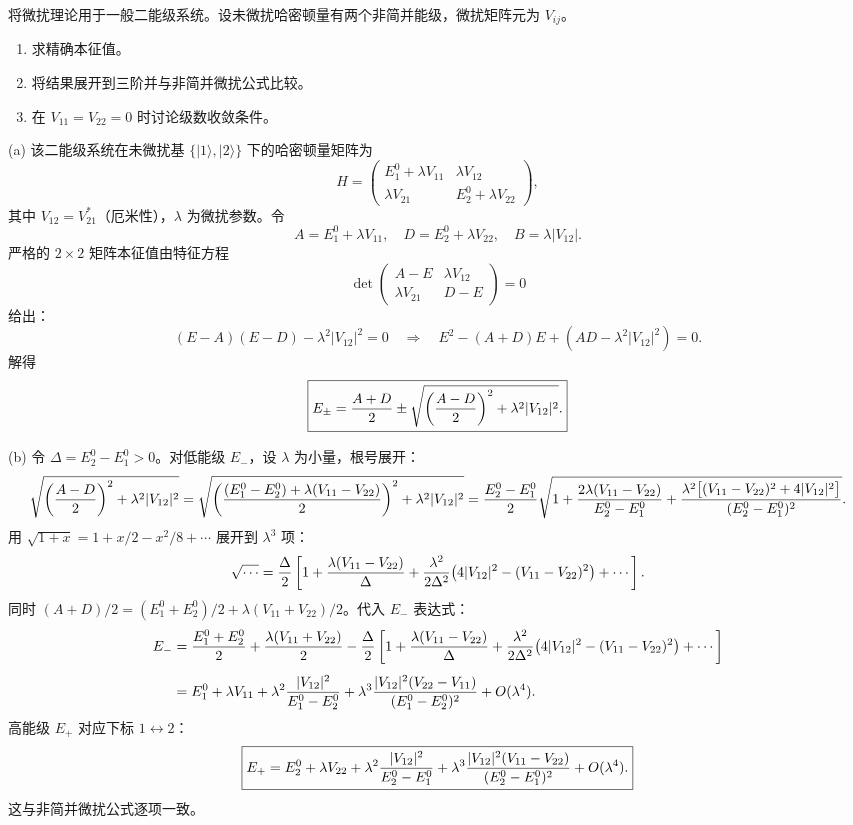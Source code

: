 \begin{question}
将微扰理论用于一般二能级系统。设未微扰哈密顿量有两个非简并能级，微扰矩阵元为 $V_{ij}$。
\begin{enumerate}
\item 求精确本征值。
\item 将结果展开到三阶并与非简并微扰公式比较。
\item 在 $V_{11}=V_{22}=0$ 时讨论级数收敛条件。
\end{enumerate}
\end{question}
\begin{solution}
(a) 该二能级系统在未微扰基 $\{|1\rangle,|2\rangle\}$ 下的哈密顿量矩阵为
\[
H=\begin{pmatrix}
E_1^0+\lambda V_{11} & \lambda V_{12}\\[2pt]
\lambda V_{21} & E_2^0+\lambda V_{22}
\end{pmatrix},
\]
其中 $V_{12}=V_{21}^*$（厄米性），$\lambda$ 为微扰参数。令
\[
A=E_1^0+\lambda V_{11},\quad D=E_2^0+\lambda V_{22},\quad
B=\lambda|V_{12}|.
\]
严格的 $2\times2$ 矩阵本征值由特征方程
\[
\det\begin{pmatrix}A-E & \lambda V_{12}\\ \lambda V_{21} & D-E\end{pmatrix}=0
\]
给出：
\[
(E-A)(E-D)-\lambda^2|V_{12}|^2=0
\quad\Longrightarrow\quad
E^2-(A+D)E+(AD-\lambda^2|V_{12}|^2)=0.
\]
解得
\[
\boxed{E_\pm={A+D\over2}\pm\sqrt{\left({A-D\over2}\right)^2+\lambda^2|V_{12}|^2}.}
\]

(b) 令 $\Delta=E_2^0-E_1^0>0$。对低能级 $E_-$，设 $\lambda$ 为小量，根号展开：
\[
\sqrt{\left({A-D\over2}\right)^2+\lambda^2|V_{12}|^2}
=\sqrt{\left({(E_1^0-E_2^0)+\lambda(V_{11}-V_{22})\over2}\right)^2+\lambda^2|V_{12}|^2}
={E_2^0-E_1^0\over2}\sqrt{1+{2\lambda(V_{11}-V_{22})\over E_2^0-E_1^0}
+{\lambda^2\bigl[(V_{11}-V_{22})^2+4|V_{12}|^2\bigr]\over (E_2^0-E_1^0)^2}}.
\]
用 $\sqrt{1+x}=1+x/2-x^2/8+\cdots$ 展开到 $\lambda^3$ 项：
\[
\sqrt{\cdots}={\Delta\over2}\left[1+
{\lambda(V_{11}-V_{22})\over\Delta}+
{\lambda^2\over2\Delta^2}\bigl(4|V_{12}|^2-(V_{11}-V_{22})^2\bigr)+\cdots\right].
\]
同时 $(A+D)/2=(E_1^0+E_2^0)/2+\lambda(V_{11}+V_{22})/2$。代入 $E_-$ 表达式：
\[
\begin{aligned}
E_-&={E_1^0+E_2^0\over2}+{\lambda(V_{11}+V_{22})\over2}
-{\Delta\over2}\left[1+{\lambda(V_{11}-V_{22})\over\Delta}
+{\lambda^2\over2\Delta^2}\bigl(4|V_{12}|^2-(V_{11}-V_{22})^2\bigr)+\cdots\right] \\[4pt]
&=E_1^0+\lambda V_{11}
+\lambda^2{|V_{12}|^2\over E_1^0-E_2^0}
+\lambda^3{|V_{12}|^2(V_{22}-V_{11})\over (E_1^0-E_2^0)^2}+O(\lambda^4).
\end{aligned}
\]
高能级 $E_+$ 对应下标 $1\leftrightarrow2$：
\[
\boxed{E_+=E_2^0+\lambda V_{22}
+\lambda^2{|V_{12}|^2\over E_2^0-E_1^0}
+\lambda^3{|V_{12}|^2(V_{11}-V_{22})\over (E_2^0-E_1^0)^2}+O(\lambda^4).}
\]
这与非简并微扰公式逐项一致。


\end{solution}
